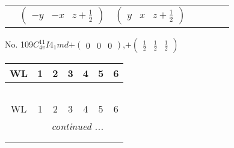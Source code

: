 \documentclass[fleqn,9pt,landscape]{jsarticle}
\begin{document}
\begin{center}
\begin{longtable}{ccccccc}
& $ \begin{pmatrix} - y & - x & z + \frac{1}{2} \end{pmatrix} $ & $ \begin{pmatrix} y & x & z + \frac{1}{2} \end{pmatrix} $ & $  $ & $  $ & $  $ & $  $ \\
\end{longtable}
\end{center}
\newpage
No. 109\quad$C_{4v}^{11}$\quad$I4_1md$\quad[ tetragonal ]\quad$+\begin{pmatrix} 0 & 0 & 0 \end{pmatrix}$,\quad $+\begin{pmatrix} \frac{1}{2} & \frac{1}{2} & \frac{1}{2} \end{pmatrix}$
\begin{center}
\renewcommand{\arraystretch}{1.2}
\begin{longtable}{ccccccc}
 \hline \hline
WL & 1 & 2 & 3 & 4 & 5 & 6 \\ \hline \endfirsthead

\multicolumn{6}{l}{\tablename\ \thetable{}} \\
 \hline \hline
WL & 1 & 2 & 3 & 4 & 5 & 6 \\ \hline \endhead

 \hline \hline
\multicolumn{6}{r}{\footnotesize\it continued ...} \\ \endfoot

 \hline \hline
\multicolumn{6}{r}{} \\ \endlastfoot


\end{longtable}
\end{center}
\end{document}
